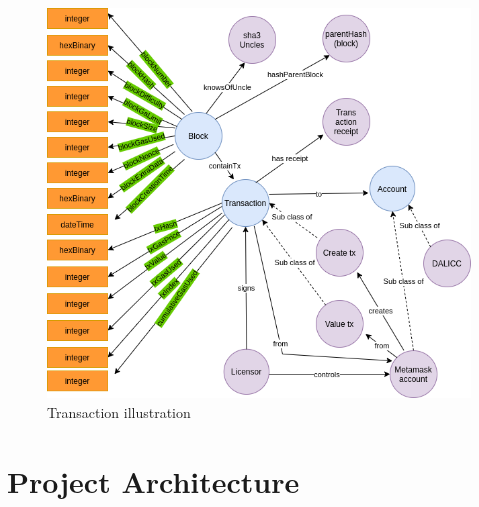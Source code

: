 \begin{itemize}
\begin{center}
	\begin{figure}[htb!]
		
		\begin{minipage}{0.75\linewidth}
			
			\includegraphics[width=1.45\textwidth]{images/chap03_knowledge_graph.png}
		\end{minipage}
		\caption{Transaction illustration}
		
	\end{figure}
	
\end{center}

\end{itemize}
\section{Project Architecture}

